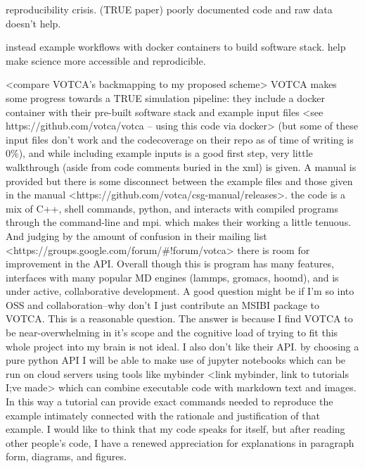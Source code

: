 reproducibility crisis.\cite{Cummings2019} \cite{Thompson2020} (TRUE paper) poorly documented code and raw data doesn't help.

instead example workflows with docker containers to build software stack.
help make science more accessible and reprodicible.

<compare VOTCA's backmapping to my proposed scheme>
VOTCA makes some progress towards a TRUE simulation pipeline: they include a docker container with their pre-built software stack and example input files <see https://github.com/votca/votca -- using this code via docker> (but some of these input files don't work and the codecoverage on their repo as of time of writing is 0\%), and while including example inputs is a good first step, very little walkthrough (aside from code comments buried in the xml) is given.
A manual is provided but there is some disconnect between the example files and those given in the manual <https://github.com/votca/csg-manual/releases>.
the code is a mix of C++, shell commands, python, and interacts with compiled programs through the command-line and mpi.
which makes their working a little tenuous.
And judging by the amount of confusion in their mailing list <https://groups.google.com/forum/#!forum/votca> there is room for improvement in the API.
Overall though this is program has many features, interfaces with many popular MD engines (lammps, gromacs, hoomd), and is under active, collaborative development.
A good question might be if I'm so into OSS and collaboration--why don't I just contribute an MSIBI package to VOTCA.
This is a reasonable question.
The answer is because I find VOTCA to be near-overwhelming in it's scope and the cognitive load of trying to fit this whole project into my brain is not ideal.
I also don't like their API.
by choosing a pure python API I will be able to make use of jupyter notebooks which can be run on cloud servers using tools like mybinder <link mybinder, link to tutorials I;ve made> which can combine executable code with markdown text and images.
In this way a tutorial can provide exact commands needed to reproduce the example intimately connected with the rationale and justification of that example.
I would like to think that my code speaks for itself, but after reading other people's code, I have a renewed appreciation for explanations in paragraph form, diagrams, and figures.

